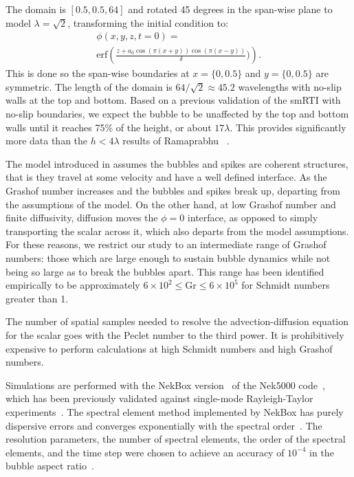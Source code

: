 The domain is $\left[0.5, 0.5, 64\right]$ and rotated 45 degrees in the span-wise plane to model $\lambda = \sqrt{2}$, transforming the initial condition to:
\begin{equation}
\begin{split}
	\phi(x,y,z,t=0) = \\
	\text{erf}\left(\frac{z + a_0 \cos(\pi (x+y)) \cos(\pi (x-y))}{\delta})\right).
\end{split}
\end{equation}
This is done so the span-wise boundaries at $x=\{0,0.5\}$ and $y=\{0,0.5\}$ are symmetric.
The length of the domain is $64/\sqrt{2} \approx 45.2$ wavelengths with no-slip walls at the top and bottom.
Based on a previous validation of the smRTI with no-slip boundaries, we expect the bubble to be unaffected by the top and bottom walls until it reaches 75\% of the height, or about $17\lambda$.
This provides significantly more data than the $h < 4 \lambda$ results of Ramaprabhu \etal~\cite{Ramaprabhu2012}.

The model introduced in  assumes the bubbles and spikes are coherent structures, that is they travel at some velocity and have a well defined interface.
As the Grashof number increases and the bubbles and spikes break up, departing from the assumptions of the model.
On the other hand, at low Grashof number and finite diffusivity, diffusion moves the $\phi = 0$ interface, as opposed to simply transporting the scalar across it, which also departs from the model assumptions.
For these reasons, we restrict our study to an intermediate range of Grashof numbers: those which are large enough to sustain bubble dynamics while not being so large as to break the bubbles apart.
This range has been identified empirically to be approximately $6 \times 10^2 \le \text{Gr} \le 6 \times 10^5$ for Schmidt numbers greater than 1.

The number of spatial samples needed to resolve the advection-diffusion equation for the scalar goes with the Peclet number to the third power.
It is prohibitively expensive to perform calculations at high Schmidt numbers and high Grashof numbers.  

Simulations are performed with the NekBox version~\cite{NekBox} of the Nek5000 code~\cite{argonne:nekdoc}, which has been previously validated against single-mode Rayleigh-Taylor experiments~\cite{Hutchinson2016,Wilkinson2007}.
The spectral element method implemented by NekBox has purely dispersive errors and converges exponentially with the spectral order~\cite{fischer:hom}.
The resolution parameters, the number of spectral elements, the order of the spectral elements, and the time step were chosen to achieve an accuracy of $10^{-4}$ in the bubble aspect ratio~\cite{hutchinson2016efficiency}.

